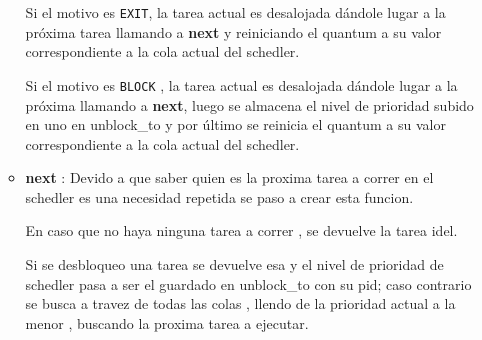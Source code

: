 \begin{itemize}
\begin{itemize}
					Si el motivo es \texttt{EXIT}, la tarea actual es desalojada
					dándole lugar a la próxima tarea llamando a \textbf{next} y reiniciando el quantum a su valor correspondiente a la cola actual del schedler.
					
					Si el motivo es \texttt{BLOCK}  , la tarea actual es desalojada 
					dándole lugar a la próxima llamando a \textbf{next}, luego se almacena el nivel de prioridad subido en uno en unblock\_to  y por último se  reinicia el quantum a su valor correspondiente a la cola actual del schedler.
				\item \textbf{next} : Devido a que saber quien es la proxima tarea a correr en el 			schedler es una necesidad repetida se paso a crear esta funcion.
					
					En caso que no haya ninguna tarea a correr , se devuelve la tarea idel.
					
					Si se desbloqueo una tarea se devuelve esa y el nivel de prioridad de schedler pasa a ser el guardado en unblock\_to con su pid; caso contrario se busca a travez de todas las colas , llendo de la prioridad actual a la menor , buscando la proxima tarea a ejecutar.

			\end{itemize}
	\end{itemize}




